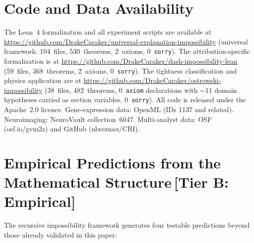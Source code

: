 \documentclass[11pt,a4paper]{article}
\begin{document}
\section*{Code and Data Availability}

The Lean~4 formalization and all experiment scripts are available at
\url{https://github.com/DrakeCaraker/universal-explanation-impossibility}
(universal framework: 104~files, 530~theorems, 2~axioms, 0~\texttt{sorry}).
The attribution-specific formalization is at
\url{https://github.com/DrakeCaraker/dash-impossibility-lean}
(59~files, 368~theorems, 2~axioms, 0~\texttt{sorry}).
The tightness classification and physics application are at
\url{https://github.com/DrakeCaraker/ostrowski-impossibility}
(38~files, 482~theorems, 0~\texttt{axiom} declarations with ${\sim}11$ domain
hypotheses carried as section variables, 0~\texttt{sorry}).
All code is released under the Apache~2.0 licence.
Gene-expression data: OpenML (IDs 1137 and related).
Neuroimaging: NeuroVault collection~6047.
Multi-analyst data: OSF (osf.io/gvm2z) and GitHub (nbreznau/CRI).

\section{Empirical Predictions from the Mathematical Structure\,\textnormal{\normalsize[Tier B: Empirical]}}
\label{sec:predictions}

The recursive impossibility framework generates four testable predictions beyond those already validated in this paper:
\end{document}
